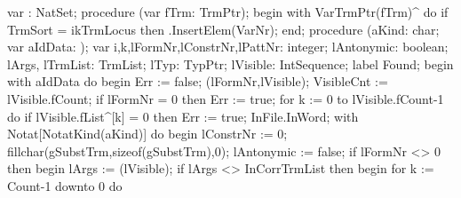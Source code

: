 \nwenddocs{}\endmoddef\nwstartdeflinemarkup{}\nwenddeflinemarkup
var : NatSet;
procedure (var fTrm: TrmPtr);
begin
   with VarTrmPtr(fTrm)^ do
      if TrmSort = ikTrmLocus then .InsertElem(VarNr);
end;
\eatline
{}\nwendcode{}\nwdocspar
\nwenddocs{}\endmoddef\nwstartdeflinemarkup{}\nwenddeflinemarkup
procedure (aKind: char; var aIdData: );
var
   i,k,lFormNr,lConstrNr,lPattNr: integer;
   lAntonymic: boolean;
   lArgs, lTrmList: TrmList;
   lTyp: TypPtr;
   lVisible: IntSequence;
label Found;
begin
   with aIdData do
   begin
      Err := false;
      (lFormNr,lVisible);
      VisibleCnt := lVisible.fCount;
      if lFormNr = 0 then Err := true;
      for k := 0 to lVisible.fCount-1 do
         if lVisible.fList^[k] = 0 then Err := true;
      InFile.InWord;
      with Notat[NotatKind(aKind)]  do
      begin
         lConstrNr := 0;
         fillchar(gSubstTrm,sizeof(gSubstTrm),0);
         lAntonymic := false;
         if lFormNr <> 0 then
         begin
            lArgs := (lVisible);
            if lArgs <> InCorrTrmList then
            begin
               for k := Count-1 downto 0 do
